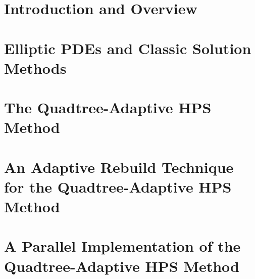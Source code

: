 \documentclass[12pt,twoside]{report}
\begin{document}

\begintext
\chapter{Introduction and Overview}
\label{chap:intro}





\chapter{Elliptic PDEs and Classic Solution Methods}
\label{chap:elliptic-pdes}




\chapter{The Quadtree-Adaptive HPS Method}
\label{chap:qahps}







\chapter{An Adaptive Rebuild Technique for the Quadtree-Adaptive HPS Method}
\label{chap:adaptive-build}






\chapter{A Parallel Implementation of the Quadtree-Adaptive HPS Method}
\label{chap:parallel}





\end{document}
